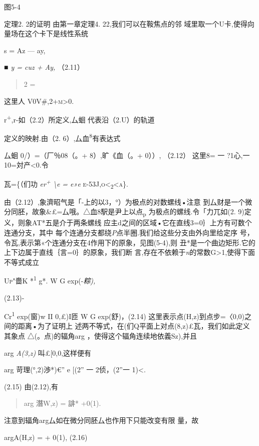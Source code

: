 \documentclass{article}
\begin{document}
图5-4

定理2. 2的证明 由第一章定理4. 22,我们可以在鞍焦点的邻
域里取一个U卡,使得向量场在这个卡下是线性系统

s = Az --- ay,

\emph{■ y = cuz + Ay,} （2.11）

\begin{quote}
2 =
\end{quote}

这里人 \textsc{V0V\#,2+m\textgreater{}0.}

r\textsuperscript{+},r-如（2.2）所定义,厶蛔 代表沿（2.U）的轨道

定义的映射.由（2. 6）,厶血\textsuperscript{8}有表达式

厶蛔 0/）=（厂％08（。+ 8）,旷《血（。+ 0））, （2.12） 这里8= 一
?1心,一10=対产\textless{}0.令

瓦=\{（们功 \emph{er\textsuperscript{+} \textbackslash{}e = e»e}
\textsc{e-53J,o\textless{}\textsubscript{2}\textless{}a\}.}

由（2.12）,象濟昭气是「-上的以3，°）为极点的对数螺线•注意
到厶财是一个微分同胚，故象\&£=厶哦。△血8駅是尹上以点\textsubscript{p}
为极点的螺线.令「力兀如(2. 9)定义，则象AT*五是介于两条螺线
应主d之间的区域•它在直线3=0｝上方有可数个连通分支，其中
每个连通分支都绕\emph{P}点半圈.我们给这些分支由外向里给定序
号，令瓦,表示第«个连通分支在4作用下的原象，见图(5-4),则
丑*是一个曲边矩形.它的上下边属于直线｛言=0｝的原象，我们断
言,存在不依赖于\emph{n}的常数G\textgreater{}1,使得下面不等式成立

\textsc{Up"}嗇K *\textsuperscript{1} g*. W G exp(-\emph{粽),}

(2.13)-

Cr\textsuperscript{1} exp(窗)w II 0,£)I匝 W G exp(舒)，(2.14)
这里表示点(H,z)到点步=〈0,0)之间的距离•为了证明上
述两不等式，在(们Q平面上对点(8,z)£瓦，我们如此定义其象点
△(。点)的辐角arg ，使得这个辐角连续地依義Sz),并且

arg \emph{A(3,z)} \textbar{}叫£{[}0,0,这样便有

\textbar{}arg 苛理(°,2)\textbar{}渉*)€'' e {[}(2'' 一 2侦，(2''一
1)\textless{}\textbar{}.

(2.15) 由(2.12),有

\begin{quote}
\textbar{}arg 潛W,z)\textbar{} = 誹* +0(1).
\end{quote}

注意到辐角arg厶如在微分同胚厶也作用下只能改变有限 量，故

\textbar{}argA(H,z)\textbar{} = + 0(1), (2.16)
\end{document}
